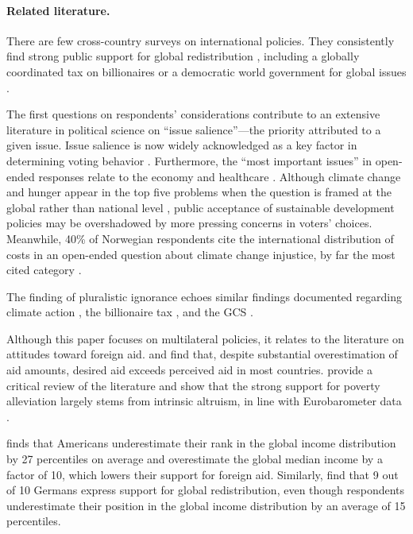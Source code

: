 \documentclass[12pt,english]{article}
\begin{document}
\begin{bibunit}
\paragraph{Related literature.}
There are few cross-country surveys on international policies. They consistently find strong public support for global redistribution \citep{fabre_majority_2025}, including a globally coordinated tax on billionaires \citep{cappelen_majority_2025} or a democratic world government for global issues \citep{ghassim_who_2024}.

The first questions on respondents' considerations contribute to an extensive literature in political science on ``issue salience''---the priority attributed to a given issue. Issue salience is now widely acknowledged as a key factor in determining voting behavior \citep{repass_issue_1971,egan_partisan_2013,krosnick_role_1988,dennison_review_2019,edwards_explaining_1995}. Furthermore, the ``most important issues'' in open-ended responses relate to the economy and healthcare \citep{wlezien_salience_2005}. Although climate change and hunger appear in the top five problems when the question is framed at the global rather than national level \citep{yeager_measuring_2011}, public acceptance of sustainable development policies may be overshadowed by more pressing concerns in voters' choices. Meanwhile, 40\% of Norwegian respondents cite the international distribution of costs in an open-ended question about climate change injustice, by far the most cited category \citep{gregersen_poor_2025}.

The finding of pluralistic ignorance echoes similar findings documented regarding climate action \citep{andre_misperceived_2024,andre_globally_2024,mildenberger_beliefs_2019}, the billionaire tax \citep{cappelen_majority_2025}, and the GCS \citep{fabre_majority_2025}.

Although this paper focuses on multilateral policies, it relates to the literature on attitudes toward foreign aid. \cite{kaufmann_foreign_2019} and \cite{fabre_majority_2025} find that, despite substantial overestimation of aid amounts, desired aid exceeds perceived aid in most countries. \cite{hudson_mile_2012} provide a critical review of the literature and show that the strong support for poverty alleviation largely stems from intrinsic altruism, in line with Eurobarometer data \citep{cho_ideology_2024}.

\cite{nair_misperceptions_2018} finds that Americans underestimate their rank in the global income distribution by 27 percentiles on average and overestimate the global median income by a factor of 10, which lowers their support for foreign aid. Similarly, \cite{fehr_your_2022} find that 9 out of 10 Germans express support for global redistribution, even though respondents underestimate their position in the global income distribution by an average of 15 percentiles.


\end{bibunit}
\end{document}
